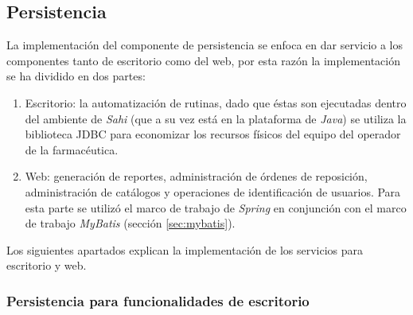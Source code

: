 \subsection{Persistencia}\label{sec:persistence}
La implementación del componente de persistencia se enfoca en dar servicio a los componentes tanto de escritorio como del web, por esta razón la implementación se ha dividido en dos partes:
\begin{enumerate}
 	\item Escritorio: la automatización de rutinas, dado que éstas son ejecutadas dentro del ambiente de \textit{Sahi} (que a su vez está en la plataforma de \textit{Java}) se utiliza la biblioteca JDBC para economizar los recursos físicos del equipo del operador de la farmacéutica.
 	\item Web: generación de reportes, administración de órdenes de reposición, administración de catálogos y operaciones de identificación  de usuarios. Para esta parte se utilizó el marco de trabajo de \textit{Spring} en conjunción con el marco de trabajo \textit{MyBatis} (sección \ref{sec:mybatis}).
\end{enumerate}
Los siguientes apartados explican la implementación de los servicios para escritorio y web.

\subsubsection{Persistencia para funcionalidades de escritorio}
